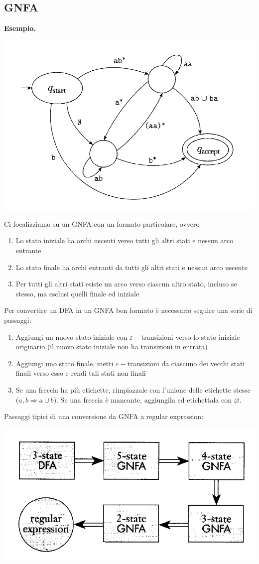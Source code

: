 \documentclass[italian]{article}
\newcommand{\example}{\noindent\textbf{Esempio.\quad}}
\begin{document}
\subsection{GNFA}
\example 
\begin{center}
	\includegraphics[width=0.7\linewidth]{images/gnfa}
\end{center}
Ci focalizziamo su un GNFA con un formato particolare, ovvero
\begin{enumerate}
	\item Lo stato iniziale ha archi uscenti verso tutti gli altri stati e nessun arco entrante
	\item Lo stato finale ha archi entranti da tutti gli altri stati e nessun arco uscente
	\item Per tutti gli altri stati esiste un arco verso ciascun altro stato, incluso se stesso, ma esclusi quelli finale ed iniziale
\end{enumerate}
Per convertire un DFA in un GNFA ben formato è necessario seguire una serie di passaggi:
\begin{enumerate}
	\item Aggiungi un nuovo stato iniziale con $\varepsilon-$transizioni verso lo stato iniziale originario (il nuovo stato iniziale non ha transizioni in entrata)
	\item Aggiungi uno stato finale, metti $\varepsilon-$transizioni  da ciascuno dei vecchi stati finali verso esso e rendi tali stati non finali
	\item Se una freccia ha più etichette, rimpiazzale con l'unione delle etichette stesse ($a,b \Rightarrow a \cup b$). Se una freccia è mancante, aggiungila ed etichettala con $\varnothing$.
\end{enumerate}
Passaggi tipici di una conversione da GNFA a regular expression:
\begin{center}
	\includegraphics[width=0.5\linewidth]{images/dfa_to_gnfa}
\end{center}
\end{document}
